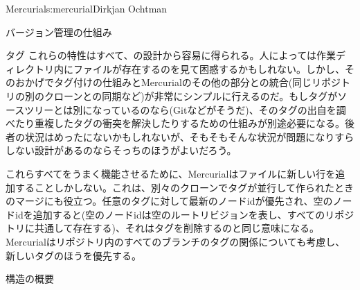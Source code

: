 \begin{aosachapter}{Mercurial}{s:mercurial}{Dirkjan Ochtman}
\begin{aosasect1}{バージョン管理の仕組み}
\begin{aosasect2}{タグ}
これらの特性はすべて、の設計から容易に得られる。人によっては作業ディレクトリ内にファイルが存在するのを見て困惑するかもしれない。しかし、そのおかげでタグ付けの仕組みとMercurialのその他の部分との統合(同じリポジトリの別のクローンとの同期など)が非常にシンプルに行えるのだ。もしタグがソースツリーとは別になっているのなら(Gitなどがそうだ)、そのタグの出自を調べたり重複したタグの衝突を解決したりするための仕組みが別途必要になる。後者の状況はめったにないかもしれないが、そもそもそんな状況が問題になりすらしない設計があるのならそっちのほうがよいだろう。

これらすべてをうまく機能させるために、Mercurialはファイルに新しい行を追加することしかしない。これは、別々のクローンでタグが並行して作られたときのマージにも役立つ。任意のタグに対して最新のノードidが優先され、空のノードidを追加すると(空のノードidは空のルートリビジョンを表し、すべてのリポジトリに共通して存在する)、それはタグを削除するのと同じ意味になる。Mercurialはリポジトリ内のすべてのブランチのタグの関係についても考慮し、新しいタグのほうを優先する。

\end{aosasect2}

\end{aosasect1}

\begin{aosasect1}{構造の概要}


\end{aosasect1}
\end{aosachapter}

